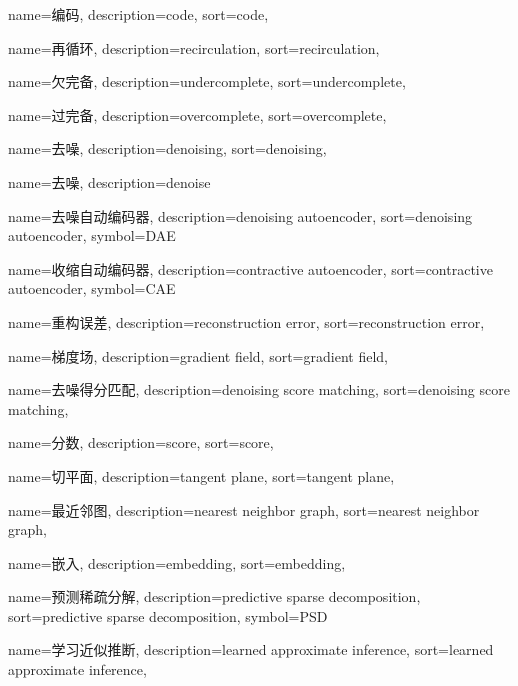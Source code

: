 {
  name=编码,
  description={code},
  sort={code},
}

{
  name=再循环,
  description={recirculation},
  sort={recirculation},
}

{
  name=欠完备,
  description={undercomplete},
  sort={undercomplete},
}

{
  name=过完备,
  description={overcomplete},
  sort={overcomplete},
}

{
  name=去噪,
  description={denoising},
  sort={denoising},
}

{
  name=去噪,
  description={denoise}
}

{
  name=去噪自动编码器,
  description={denoising autoencoder},
  sort={denoising autoencoder},
  symbol={DAE}
}

{
  name=收缩自动编码器,
  description={contractive autoencoder},
  sort={contractive autoencoder},
  symbol={CAE}
}

{
  name=重构误差,
  description={reconstruction error},
  sort={reconstruction error},
}

{
  name=梯度场,
  description={gradient field},
  sort={gradient field},
}

{
  name=去噪得分匹配,
  description={denoising score matching},
  sort={denoising score matching},
}

{
  name=分数,
  description={score},
  sort={score},
}

{
  name=切平面,
  description={tangent plane},
  sort={tangent plane},
}

{
  name=最近邻图,
  description={nearest neighbor graph},
  sort={nearest neighbor graph},
}

{
  name=嵌入,
  description={embedding},
  sort={embedding},
}

{
  name=预测稀疏分解,
  description={predictive sparse decomposition},
  sort={predictive sparse decomposition},
  symbol={PSD}
}

{
  name=学习近似推断,
  description={learned approximate inference},
  sort={learned approximate inference},
}

